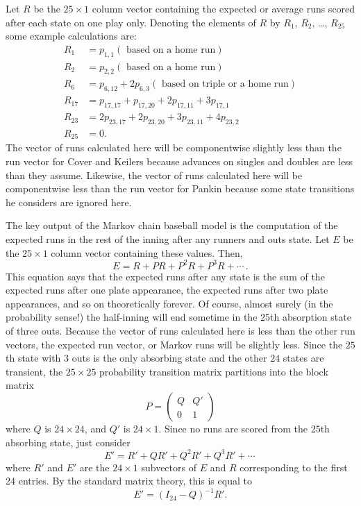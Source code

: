 \documentclass[12pt]{article}
\begin{document}
Let \( R \) be the \( 25 \times 1 \) column vector containing the
expected or average runs scored after each state on one play only.
Denoting the elements of \( R \) by \( R_{1} \), \( R_{2} \), \dots, \(
R_{25} \) some example calculations are:
\begin{align*}
    R_{1}       &= p_{1,1} (\text{ based on a home run}) \\
    R_{2}       &= p_{2,2} (\text{ based on a home run}) \\
    R_{6}       &= p_{6,12} + 2p_{6,3} (\text{ based on triple or a home
    run}) \\
    R_{17}      &= p_{17,17} + p_{17,20} + 2p_{17,11} + 3p_{17,1} \\
    R_{23}      &= 2p_{23,17} + 2p_{23,20} + 3p_{23,11} + 4p_{23,2} \\
    R_{25}      &= 0.
\end{align*}
The vector of runs calculated here will be componentwise slightly less
than the run vector for Cover and Keilers because advances on singles
and doubles are less than they assume.  Likewise, the vector of runs
calculated here will be componentwise less than the run vector for
Pankin because some state transitions he considers are ignored here.

The key output of the Markov chain baseball model is the computation of
the expected runs in the rest of the inning after any runners and outs
state.  Let \( E \) be the \( 25 \times 1 \) column vector containing
these values.  Then,
\[
    E = R + P R + P^2 R + P^3 R + \cdots\,.
\] This equation says that the expected runs after any state is the sum
of the expected runs after one plate appearance, the expected runs after
two plate appearances, and so on theoretically forever.  Of course,
almost surely (in the probability sense!) the half-inning will end
sometime in the \( 25 \)th absorption state of three outs.  Because the
vector of runs calculated here is less than the other run vectors, the
expected run vector, or Markov runs will be slightly less.  Since the \(
25 \)th state with \( 3 \) outs is the only absorbing state and the
other \( 24 \) states are transient, the \( 25 \times 25 \) probability
transition matrix partitions into the block matrix
\[
    P =
    \begin{pmatrix}
        Q       & Q' \\
        0       & 1
    \end{pmatrix}
\] where \( Q \) is \( 24 \times 24 \), and \( Q' \) is \( 24 \times 1 \).
Since no runs are scored from the \( 25 \)th absorbing state, just
consider
\[
    E' = R' + Q R' + Q^2 R' + Q^3 R' + \cdots\,
\] where \( R' \) and \( E' \) are the \( 24 \times 1 \) subvectors of \(
E \) and \( R \) corresponding to the first 24 entries.  By the standard
matrix theory, this is equal to
\[
    E' = ( I_{24} - Q )^{-1} R'.
\]
\end{document}
